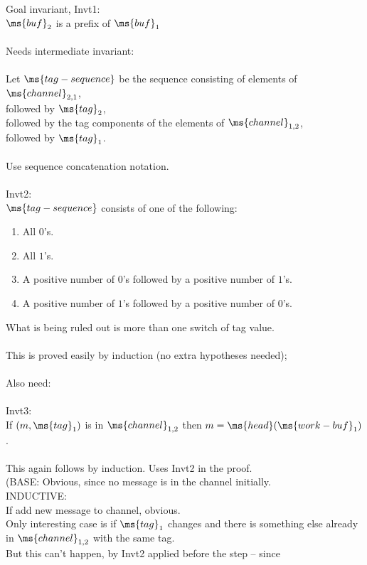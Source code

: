 Goal invariant, Invt1: \\
$\ms{buf}_2$ is a prefix of $\ms{buf}_1$ \\
\\
Needs intermediate invariant: \\
\\
Let $\ms{tag-sequence}$ be the sequence consisting of elements of
$\ms{channel}_{2,1}$, \\
followed by $\ms{tag}_2$, \\
followed by the tag components of the elements of $\ms{channel}_{1,2}$, \\
followed by $\ms{tag}_1$. \\
\\
Use sequence concatenation notation. \\
\\
Invt2: \\
$\ms{tag-sequence}$ consists of one of the following:
\begin{enumerate}
\item
All $0$'s.
\item
All $1$'s. 
\item
A positive number of $0$'s followed by a positive number of $1$'s.
\item
A positive number of $1$'s followed by a positive number of $0$'s.
\end{enumerate}
What is being ruled out is more than one switch of tag value. \\
\\
This is proved easily by induction (no extra hypotheses needed);
\\
\\
Also need: \\
\\
Invt3: \\
If $(m,\ms{tag}_1)$ is in $\ms{channel}_{1,2}$ then $m =
\ms{head}(\ms{work-buf}_1)$. \\
\\
This again follows by induction.  Uses Invt2 in the proof. \\
(BASE:  Obvious, since no message is in the channel initially. \\
INDUCTIVE: \\
If add new message to channel, obvious.  \\
Only interesting case is if $\ms{tag}_1$ changes and there is something
else already in $\ms{channel}_{1,2}$ with the same tag. \\
But this can't happen, by Invt2 applied before the step -- since
